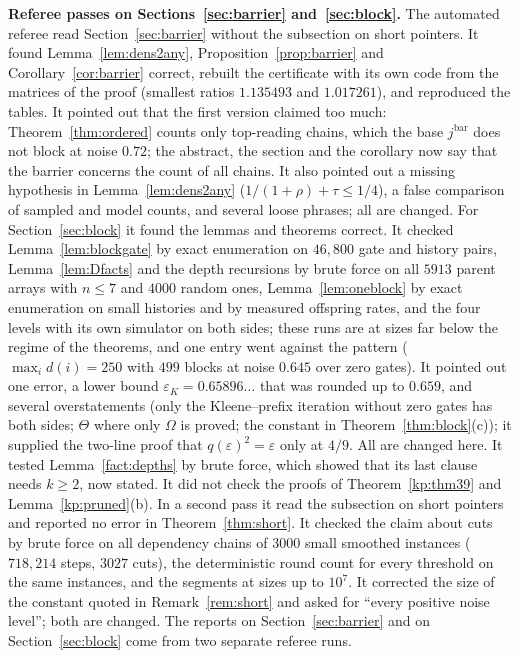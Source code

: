\documentclass[11pt]{amsart}
\theoremstyle{definition}
\theoremstyle{remark}
\newcommand{\eps}{\varepsilon}
\begin{document}
\medskip\noindent\textbf{Referee passes on Sections~\ref{sec:barrier} and~\ref{sec:block}.} The
automated referee read Section~\ref{sec:barrier} without the subsection on short pointers. It
found Lemma~\ref{lem:dens2any}, Proposition~\ref{prop:barrier} and Corollary~\ref{cor:barrier}
correct, rebuilt the certificate with its own code from the matrices of the proof (smallest ratios
$1.135493$ and $1.017261$), and reproduced the tables. It pointed out that the first version
claimed too much: Theorem~\ref{thm:ordered} counts only top-reading chains, which the base
$j^{\mathrm{bar}}$ does not block at noise $0.72$; the abstract, the section and the corollary now
say that the barrier concerns the count of all chains. It also pointed out a missing hypothesis in
Lemma~\ref{lem:dens2any} ($1/(1+\rho)+\tau\le1/4$), a false comparison of sampled and model
counts, and several loose phrases; all are changed. For Section~\ref{sec:block} it found the
lemmas and theorems correct. It checked Lemma~\ref{lem:blockgate} by exact enumeration on
$46{,}800$ gate and history pairs, Lemma~\ref{lem:Dfacts} and the depth recursions by brute force
on all $5913$ parent arrays with $n\le7$ and $4000$ random ones, Lemma~\ref{lem:oneblock} by exact
enumeration on small histories and by measured offspring rates, and the four levels with its own
simulator on both sides; these runs are at sizes far below the regime of the theorems, and one
entry went against the pattern ($\max_id(i)=250$ with $499$ blocks at noise $0.645$ over zero
gates). It pointed out one error, a lower bound $\eps_K=0.65896\ldots$ that was
rounded up to $0.659$, and several overstatements (only the Kleene--prefix iteration without zero
gates has both sides; $\Theta$ where only $\Omega$ is proved; the constant in
Theorem~\ref{thm:block}(c)); it supplied the two-line proof that $q(\eps)^2=\eps$ only at $4/9$.
All are changed here. It tested
Lemma~\ref{fact:depths} by brute force, which showed that its last clause needs $k\ge2$, now
stated. It did not check the proofs of Theorem~\ref{kp:thm39} and Lemma~\ref{kp:pruned}(b). In a second pass it read the subsection on short pointers and reported no error in
Theorem~\ref{thm:short}. It checked the claim about cuts by brute force on all dependency chains
of $3000$ small smoothed instances ($718{,}214$ steps, $3027$ cuts), the deterministic round count
for every threshold on the same instances, and the segments at sizes up to $10^7$. It corrected the
size of the constant quoted in Remark~\ref{rem:short} and asked for ``every positive noise
level''; both are changed. The reports on Section~\ref{sec:barrier} and on
Section~\ref{sec:block} come from two separate referee runs.
\end{document}

